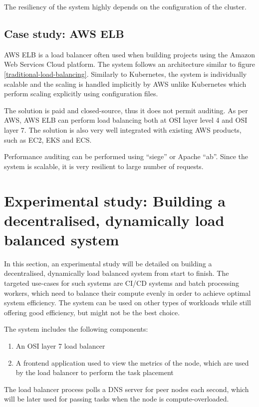 \documentclass[conference]{IEEEtran}
\begin{document}
    The resiliency of the system highly depends on the configuration of the cluster.

\subsection{Case study: AWS ELB}
    AWS ELB is a load balancer often used when building projects using the Amazon Web Services Cloud platform. The system
follows an architecture similar to figure \ref{traditional-load-balancing}. Similarly to Kubernetes, the system is individually
scalable and the scaling is handled implicitly by AWS unlike Kubernetes which perform  scaling explicitly using configuration
files.

    The solution is paid and closed-source, thus it does not permit auditing. As per AWS, AWS ELB can perform load balancing
both at OSI layer level 4 and OSI layer 7. The solution is also very well integrated with existing AWS products, such as EC2,
EKS and ECS.

    Performance auditing can be performed using ``siege'' or Apache ``ab''. Since the system is scalable, it is very resilient
to large number of requests.

\section{Experimental study: Building a decentralised, dynamically load balanced system}
    In this section, an experimental study will be detailed on building a decentralised, dynamically load balanced system
from start to finish. The targeted use-cases for such systems are CI/CD systems and batch processing workers, which need
to balance their compute evenly in order to achieve optimal system efficiency. The system can be used on other types of
workloads while still offering good efficiency, but might not be the best choice.

    The system includes the following components:

    \begin{enumerate}
        \item An OSI layer 7 load balancer
        \item A frontend application used to view the metrics of the node, which are used by the load balancer
        to perform the task placement
    \end{enumerate}

    The load balancer process polls a DNS server for peer nodes each second, which will be later used for passing tasks
when the node is compute-overloaded.
\end{document}
